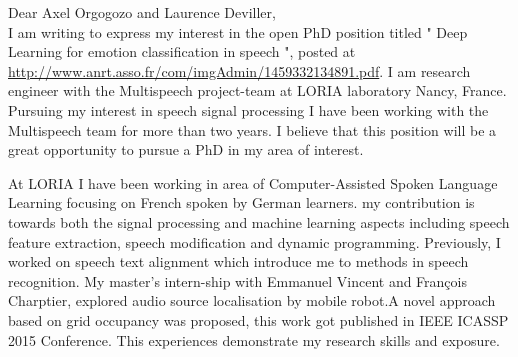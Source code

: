 \documentclass[10pt,a4paper]{letter}
\begin{document}
Dear Axel Orgogozo and Laurence Deviller,\\

		I am writing to express my interest in the open PhD position titled " Deep Learning for emotion classification in speech ", posted at \url{http://www.anrt.asso.fr/com/imgAdmin/1459332134891.pdf}. I am research engineer with the Multispeech project-team at LORIA laboratory Nancy, France. Pursuing my interest in speech signal processing I have been working with the Multispeech team for more than two years. I believe that this position will be a great opportunity to pursue a PhD in my area of interest. 
		
		At LORIA I have been working in area of Computer-Assisted Spoken Language Learning focusing on French spoken by German learners. my contribution is towards both the signal processing and machine learning aspects including speech feature extraction, speech modification and dynamic programming. Previously, I worked on speech text alignment which introduce me to methods in speech recognition. My master's intern-ship with Emmanuel Vincent and François Charptier, explored audio source localisation by mobile robot.A novel approach based on grid occupancy was proposed, this work got published in IEEE ICASSP 2015 Conference.  This experiences demonstrate my research skills and exposure.
		
\end{document}

